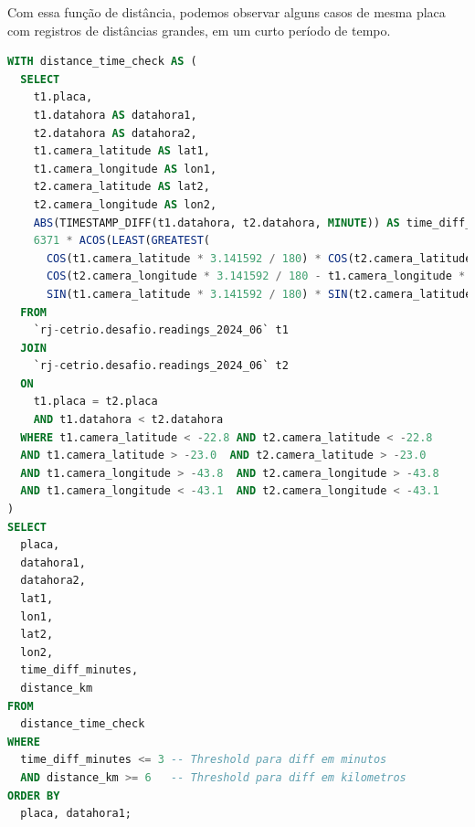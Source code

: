 \documentclass{article}
\begin{document}
Com essa função de distância, podemos observar alguns casos de mesma placa com registros de distâncias grandes, em um curto período de tempo.

\begin{lstlisting}[language=SQL,caption={Exemplo de query SQL para detectar inconsistências e retornar casos de mesma placa com registros distantes um do outro, segundo a fórmula de haversine, mas com diferença de tempo entre eles de curta. Considerando inconsistente percorrer mais de 6km em menos de 3 minutos (120km/h de média). Como discutido no artigo, podemos substituir última condicional WHERE para "time\_diff\_minutes $ \leq $ distance\_km/5" para melhor resultados.},label={lst:sqlquery8}]
WITH distance_time_check AS (
  SELECT
    t1.placa,
    t1.datahora AS datahora1,
    t2.datahora AS datahora2,
    t1.camera_latitude AS lat1,
    t1.camera_longitude AS lon1,
    t2.camera_latitude AS lat2,
    t2.camera_longitude AS lon2,
    ABS(TIMESTAMP_DIFF(t1.datahora, t2.datahora, MINUTE)) AS time_diff_minutes,
    6371 * ACOS(LEAST(GREATEST(
      COS(t1.camera_latitude * 3.141592 / 180) * COS(t2.camera_latitude * 3.141592 / 180) * 
      COS(t2.camera_longitude * 3.141592 / 180 - t1.camera_longitude * 3.141592 / 180) + 
      SIN(t1.camera_latitude * 3.141592 / 180) * SIN(t2.camera_latitude * 3.141592 / 180),-1),1)) AS distance_km
  FROM
    `rj-cetrio.desafio.readings_2024_06` t1
  JOIN
    `rj-cetrio.desafio.readings_2024_06` t2
  ON
    t1.placa = t2.placa
    AND t1.datahora < t2.datahora
  WHERE t1.camera_latitude < -22.8 AND t2.camera_latitude < -22.8 
  AND t1.camera_latitude > -23.0  AND t2.camera_latitude > -23.0 
  AND t1.camera_longitude > -43.8  AND t2.camera_longitude > -43.8
  AND t1.camera_longitude < -43.1  AND t2.camera_longitude < -43.1
)
SELECT
  placa,
  datahora1,
  datahora2,
  lat1,
  lon1,
  lat2,
  lon2,
  time_diff_minutes,
  distance_km
FROM
  distance_time_check
WHERE
  time_diff_minutes <= 3 -- Threshold para diff em minutos
  AND distance_km >= 6   -- Threshold para diff em kilometros
ORDER BY
  placa, datahora1;
\end{lstlisting}
\end{document}

